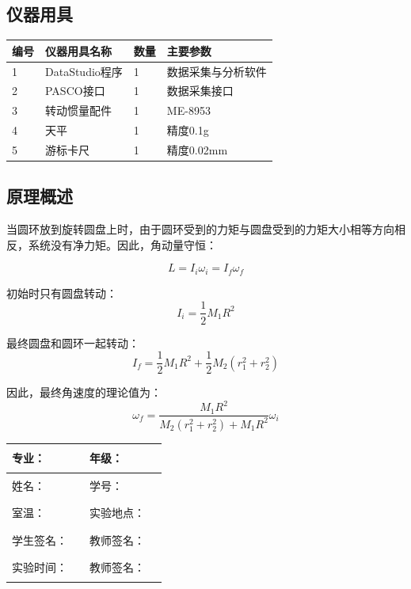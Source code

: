 \documentclass[dvipsnames, svgnames,a4paper,11pt]{article}
\begin{document}
\subsection{仪器用具}
\begin{table}[htbp]
	\centering
	\renewcommand\arraystretch{1.6}
	\begin{tabular}{p{}|p{}|p{}|p{}}
	\hline
	编号& 仪器用具名称 & 数量 &  主要参数 \\
	\hline
	1 & DataStudio程序 & 1 & 数据采集与分析软件 \\
	2 & PASCO接口 & 1 & 数据采集接口 \\
	3 & 转动惯量配件 & 1 & ME-8953 \\
	4 & 天平 & 1 & 精度0.1g \\
	5 & 游标卡尺 & 1 & 精度0.02mm \\
	\hline
	\end{tabular}
\end{table}

\subsection{原理概述}

当圆环放到旋转圆盘上时，由于圆环受到的力矩与圆盘受到的力矩大小相等方向相反，系统没有净力矩。因此，角动量守恒：

\begin{equation}
	L = I_i\omega_i = I_f\omega_f
\end{equation}

初始时只有圆盘转动：
\begin{equation}
	I_i = \frac{1}{2}M_1R^2
\end{equation}

最终圆盘和圆环一起转动：
\begin{equation}
	I_f = \frac{1}{2}M_1R^2 + \frac{1}{2}M_2(r_1^2 + r_2^2)
\end{equation}

因此，最终角速度的理论值为：
\begin{equation}
	\omega_f = \frac{M_1R^2}{M_2(r_1^2 + r_2^2) + M_1R^2}\omega_i
\end{equation}

\clearpage
\begin{table}
	\renewcommand\arraystretch{1.7}
	\centering
	\begin{tabularx}{\textwidth}{|X|X|X|X|}
	\hline
	专业：& \rule{2.5cm}{0.4pt} & 年级：& \rule{2.5cm}{0.4pt}\\
	\hline
	姓名：& \rule{2.5cm}{0.4pt} & 学号：& \rule{2.5cm}{0.4pt}\\
	\hline
	室温：& \rule{2.5cm}{0.4pt} & 实验地点：& \rule{2.5cm}{0.4pt}\\
	\hline
	学生签名：& \rule{2.5cm}{0.4pt} & 教师签名：& \rule{2.5cm}{0.4pt}\\
	\hline
	实验时间：& \rule{2.5cm}{0.4pt} & 教师签名：& \rule{2.5cm}{0.4pt}\\
	\hline
	\end{tabularx}
\end{table}
\end{document}
